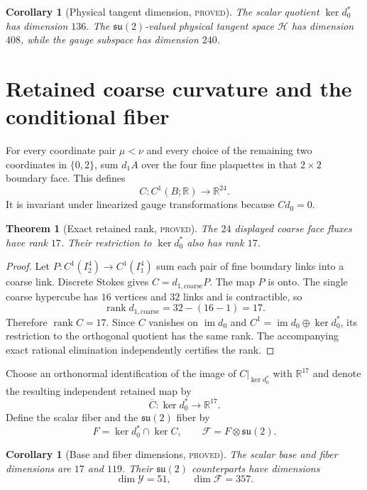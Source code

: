\documentclass[11pt]{article}
\newcommand{\proved}{\textcolor{provedgreen}{\textsc{proved}}}
\newcommand{\R}{\mathbb R}
\newcommand{\rank}{\operatorname{rank}}
\newcommand{\im}{\operatorname{im}}
\newcommand{\su}{\mathfrak{su}(2)}
\newtheorem{theorem}[definition]{Theorem}
\newtheorem{corollary}[definition]{Corollary}
\theoremstyle{remark}
\begin{document}
\begin{corollary}[Physical tangent dimension, \proved]
The scalar quotient $\ker d_0^*$ has dimension $136$.  The $\su$-valued
physical tangent space $\mathcal H$ has dimension $408$, while the gauge
subspace has dimension $240$.
\end{corollary}

\section{Retained coarse curvature and the conditional fiber}

For every coordinate pair $\mu<\nu$ and every choice of the remaining two
coordinates in $\{0,2\}$, sum $d_1A$ over the four fine plaquettes in that
$2\times2$ boundary face.  This defines
\[
 C:C^1(B;\R)\longrightarrow\R^{24}.
\]
It is invariant under linearized gauge transformations because $Cd_0=0$.

\begin{theorem}[Exact retained rank, \proved]\label{thm:rank}
The $24$ displayed coarse face fluxes have rank $17$.  Their restriction to
$\ker d_0^*$ also has rank $17$.
\end{theorem}
\begin{proof}
Let $P:C^1(I_2^4)\to C^1(I_1^4)$ sum each pair of fine boundary links into a
coarse link.  Discrete Stokes gives
$C=d_{1,\mathrm{coarse}}P$.  The map $P$ is onto.  The single coarse
hypercube has $16$ vertices and $32$ links and is contractible, so
\[
 \rank d_{1,\mathrm{coarse}}=32-(16-1)=17.
\]
Therefore $\rank C=17$.  Since $C$ vanishes on $\im d_0$ and
$C^1=\im d_0\oplus\ker d_0^*$, its restriction to the orthogonal quotient has
the same rank.  The accompanying exact rational elimination independently
certifies the rank.
\end{proof}

Choose an orthonormal identification of the image of $C|_{\ker d_0^*}$ with
$\R^{17}$ and denote the resulting independent retained map by
\[
 \overline C:\ker d_0^*\to\R^{17}.
\]
Define the scalar fiber and the $\su$ fiber by
\begin{equation}\label{eq:fiber}
 F=\ker d_0^*\cap\ker C,
 \qquad \mathcal F=F\otimes\su.
\end{equation}

\begin{corollary}[Base and fiber dimensions, \proved]
The scalar base and fiber dimensions are $17$ and $119$.  Their $\su$
counterparts have dimensions
\[
 \dim\mathcal Y=51,
 \qquad \dim\mathcal F=357.
\]
\end{corollary}
\end{document}
